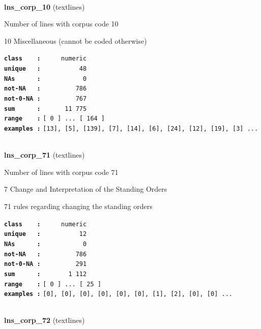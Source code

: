 \documentclass[]{article}
\begin{document}
~

\textbf{lns\_corp\_10} (textlines)

Number of lines with corpus code 10

10 Miscellaneous (cannot be coded otherwise)

\textbf{\texttt{class\ \ \ \ :}} \texttt{~~~~~numeric}\\
\textbf{\texttt{unique\ \ \ :}} \texttt{~~~~~~~~~~48}\\
\textbf{\texttt{NAs\ \ \ \ \ \ :}} \texttt{~~~~~~~~~~~0}\\
\textbf{\texttt{not-NA\ \ \ :}} \texttt{~~~~~~~~~786}\\
\textbf{\texttt{not-0-NA\ :}} \texttt{~~~~~~~~~767}\\
\textbf{\texttt{sum\ \ \ \ \ \ :}} \texttt{~~~~~~11~775}\\
\textbf{\texttt{range\ \ \ \ :}}
\texttt{{[}\ 0\ {]}\ ...\ {[}\ 164\ {]}}\\
\textbf{\texttt{examples\ :}}
\texttt{{[}13{]},\ {[}5{]},\ {[}139{]},\ {[}7{]},\ {[}14{]},\ {[}6{]},\ {[}24{]},\ {[}12{]},\ {[}19{]},\ {[}3{]}\ ...}\\

~

\textbf{lns\_corp\_71} (textlines)

Number of lines with corpus code 71

7 Change and Interpretation of the Standing Orders

71 rules regarding changing the standing orders

\textbf{\texttt{class\ \ \ \ :}} \texttt{~~~~~numeric}\\
\textbf{\texttt{unique\ \ \ :}} \texttt{~~~~~~~~~~12}\\
\textbf{\texttt{NAs\ \ \ \ \ \ :}} \texttt{~~~~~~~~~~~0}\\
\textbf{\texttt{not-NA\ \ \ :}} \texttt{~~~~~~~~~786}\\
\textbf{\texttt{not-0-NA\ :}} \texttt{~~~~~~~~~291}\\
\textbf{\texttt{sum\ \ \ \ \ \ :}} \texttt{~~~~~~~1~112}\\
\textbf{\texttt{range\ \ \ \ :}}
\texttt{{[}\ 0\ {]}\ ...\ {[}\ 25\ {]}}\\
\textbf{\texttt{examples\ :}}
\texttt{{[}0{]},\ {[}0{]},\ {[}0{]},\ {[}0{]},\ {[}0{]},\ {[}0{]},\ {[}1{]},\ {[}2{]},\ {[}0{]},\ {[}0{]}\ ...}\\

~

\textbf{lns\_corp\_72} (textlines)
\end{document}
